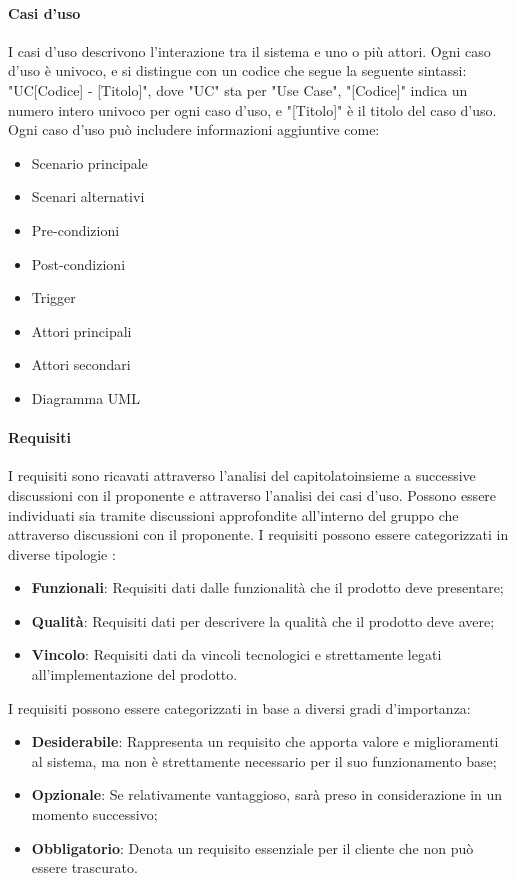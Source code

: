 \paragraph{Casi d'uso}\label{Casi} 
I casi d'uso descrivono l'interazione tra il sistema e uno o più attori. Ogni caso d'uso è univoco, e si distingue con un codice che segue la seguente sintassi: "UC[Codice] - [Titolo]",
dove "UC" sta per "Use Case", "[Codice]" indica un numero intero univoco per ogni caso d'uso, e "[Titolo]" è il titolo del caso d'uso. 
Ogni caso d'uso può includere informazioni aggiuntive come:
\begin{itemize}
    \item Scenario principale
    \item Scenari alternativi
    \item Pre-condizioni
    \item Post-condizioni
    \item Trigger
    \item Attori principali
    \item Attori secondari
    \item Diagramma UML
\end{itemize}

\paragraph{Requisiti} 
I requisiti sono ricavati attraverso l’analisi del capitolato\glo insieme a successive discussioni con il proponente e attraverso l’analisi dei casi d’uso.
Possono essere individuati sia tramite discussioni approfondite all’interno del gruppo che attraverso discussioni con il proponente.
I requisiti possono essere categorizzati in diverse tipologie : 
\begin{itemize}
    \item \textbf{Funzionali}: Requisiti dati dalle funzionalità che il prodotto deve presentare;
    \item \textbf{Qualità}: Requisiti dati per descrivere la qualità che il prodotto deve avere;
    \item \textbf{Vincolo}: Requisiti dati da vincoli tecnologici e strettamente legati all’implementazione del prodotto.
\end{itemize}
I requisiti possono essere categorizzati in base a diversi gradi d'importanza:
\begin{itemize}
    \item \textbf{Desiderabile}: Rappresenta un requisito che apporta valore e miglioramenti al sistema, ma non è strettamente necessario per il suo funzionamento base;
    \item \textbf{Opzionale}: Se relativamente vantaggioso, sarà preso in considerazione in un momento successivo;
    \item \textbf{Obbligatorio}: Denota un requisito essenziale per il cliente che non può essere trascurato.
\end{itemize}

